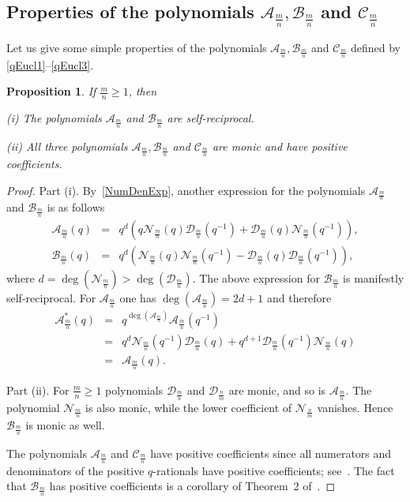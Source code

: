 \documentclass{article}[12pt]
\theoremstyle{plain}
\newtheorem{prop}[lem]{Proposition}
\theoremstyle{definition}
\newcommand{\A}{\mathcal{A}}
\newcommand{\B}{\mathcal{B}}
\newcommand{\cC}{\mathcal{C}}
\newcommand{\cD}{\mathcal{D}}
\newcommand{\cN}{\mathcal{N}}
\begin{document}
\subsection{Properties of the polynomials $\A_{\frac{m}{n}},\B_{\frac{m}{n}}$ and $\cC_{\frac{m}{n}}$}\label{PropSec}

Let us give some simple properties of the polynomials 
$\A_{\frac{m}{n}},\B_{\frac{m}{n}}$ and $\cC_{\frac{m}{n}}$ defined by
\eqref{qEucl1}--\eqref{qEucl3}.

\begin{prop}
\label{PropProp}
If $\frac{m}{n}\geq1$, then

(i)
The polynomials $\A_{\frac{m}{n}}$ and $\B_{\frac{m}{n}}$  are self-reciprocal.

(ii)
All three polynomials $\A_{\frac{m}{n}},\B_{\frac{m}{n}}$ and $\cC_{\frac{m}{n}}$
are monic and have positive coefficients.

\end{prop}

\begin{proof}
Part (i).
By~\eqref{NumDenExp}, another expression for 
the polynomials $\A_{\frac{m}{n}}$ and $\B_{\frac{m}{n}}$ is as follows
\begin{eqnarray*}
\A_{\frac{m}{n}}(q) &=&
q^d\left(
q\cN_{\frac{m}{n}}(q)\cD_{\frac{m}{n}}(q^{-1})
+\cD_{\frac{m}{n}}(q)\cN_{\frac{m}{n}}(q^{-1})
\right),
\\[6pt]
\B_{\frac{m}{n}}(q)&=&
q^d\left(\cN_{\frac{m}{n}}(q)\cN_{\frac{m}{n}}(q^{-1})
-\cD_{\frac{m}{n}}(q)\cD_{\frac{m}{n}}(q^{-1})\right),
\end{eqnarray*}
where $d=\deg(\cN_{\frac{m}{n}})>\deg(\cD_{\frac{m}{n}})$.
The above expression for $\B_{\frac{m}{n}}$ is manifestly self-reciprocal.
For $\A_{\frac{m}{n}}$ one has $\deg\left(\A_{\frac{m}{n}}\right)=2d+1$
and therefore
$$
\begin{array}{rcl}
\A^*_{\frac{m}{n}}(q) &=&
q^{\deg\left(\A_{\frac{m}{n}}\right)}\A_{\frac{m}{n}}(q^{-1})\\[6pt]
&=&
q^{d}\cN_{\frac{m}{n}}(q^{-1})\cD_{\frac{m}{n}}(q)
+q^{d+1}\cD_{\frac{m}{n}}(q^{-1})\cN_{\frac{m}{n}}(q)\\[6pt]
&=&\A_{\frac{m}{n}}(q).
\end{array}
$$


Part (ii).
For $\frac{m}{n}\geq1$ polynomials 
$\cD_{\frac{m}{n}}$ and $\cD_{\frac{n}{m}}$ are monic, and so is $\A_{\frac{m}{n}}$.
The polynomial $\cN_{\frac{m}{n}}$ is also monic, 
while the lower coefficient of $\cN_{\frac{n}{m}}$ vanishes.
Hence $\B_{\frac{m}{n}}$ is monic as well.

The polynomials $\A_{\frac{m}{n}}$ and $\cC_{\frac{m}{n}}$ have positive coefficients since
all numerators and denominators of the positive $q$-rationals have positive coefficients; 
see~\cite{MGOfmsigma}.
The fact that $\B_{\frac{m}{n}}$ has positive coefficients is a corollary of
Theorem~2 of~\cite{MGOfmsigma}.
\end{proof}
\end{document}

